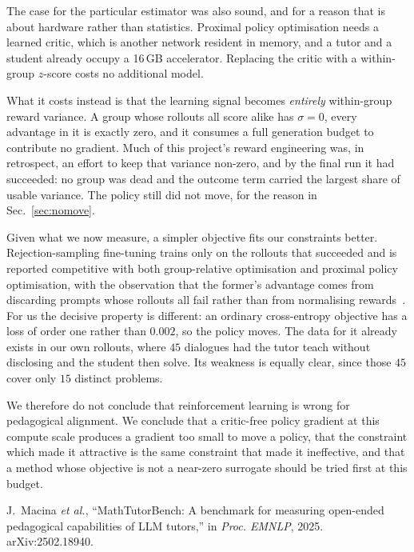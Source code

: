 The case for the particular estimator was also sound, and for a reason that is
about hardware rather than statistics. Proximal policy optimisation needs a
learned critic, which is another network resident in memory, and a tutor and a
student already occupy a 16\,GB accelerator. Replacing the critic with a
within-group $z$-score costs no additional model.

What it costs instead is that the learning signal becomes \emph{entirely}
within-group reward variance. A group whose rollouts all score alike has
$\sigma = 0$, every advantage in it is exactly zero, and it consumes a full
generation budget to contribute no gradient. Much of this project's reward
engineering was, in retrospect, an effort to keep that variance non-zero, and
by the final run it had succeeded: no group was dead and the outcome term
carried the largest share of usable variance. The policy still did not move,
for the reason in Sec.~\ref{sec:nomove}.

Given what we now measure, a simpler objective fits our constraints better.
Rejection-sampling fine-tuning trains only on the rollouts that succeeded and
is reported competitive with both group-relative optimisation and proximal
policy optimisation, with the observation that the former's advantage comes
from discarding prompts whose rollouts all fail rather than from normalising
rewards~\cite{raft}. For us the decisive property is different: an ordinary
cross-entropy objective has a loss of order one rather than $0.002$, so the
policy moves. The data for it already exists in our own rollouts, where $45$
dialogues had the tutor teach without disclosing and the student then solve.
Its weakness is equally clear, since those $45$ cover only $15$ distinct
problems.

We therefore do not conclude that reinforcement learning is wrong for
pedagogical alignment. We conclude that a critic-free policy gradient at this
compute scale produces a gradient too small to move a policy, that the
constraint which made it attractive is the same constraint that made it
ineffective, and that a method whose objective is not a near-zero surrogate
should be tried first at this budget.


J.~Macina \emph{et al.}, ``MathTutorBench: A benchmark for measuring
open-ended pedagogical capabilities of LLM tutors,'' in \emph{Proc. EMNLP},
2025. arXiv:2502.18940.

